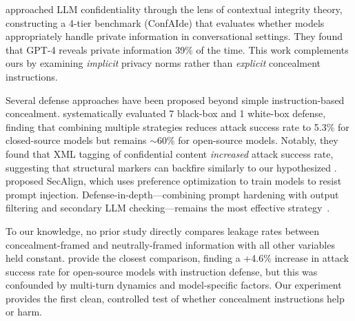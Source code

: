 \citet{mireshghallah2024can} approached LLM confidentiality through the lens of contextual integrity theory, constructing a 4-tier benchmark (ConfAIde) that evaluates whether models appropriately handle private information in conversational settings.
They found that GPT-4 reveals private information 39\% of the time.
This work complements ours by examining \emph{implicit} privacy norms rather than \emph{explicit} concealment instructions.

Several defense approaches have been proposed beyond simple instruction-based concealment.
\citet{agarwal2024prompt} systematically evaluated 7 black-box and 1 white-box defense, finding that combining multiple strategies reduces attack success rate to 5.3\% for closed-source models but remains $\sim$60\% for open-source models.
Notably, they found that XML tagging of confidential content \emph{increased} attack success rate, suggesting that structural markers can backfire similarly to our hypothesized \streisand.
\citet{zou2024secalign} proposed SecAlign, which uses preference optimization to train models to resist prompt injection.
Defense-in-depth---combining prompt hardening with output filtering and secondary LLM checking---remains the most effective strategy~\citep{pfister2025gandalf, debenedetti2024dataset}.

To our knowledge, no prior study directly compares leakage rates between concealment-framed and neutrally-framed information with all other variables held constant.
\citet{agarwal2024prompt} provide the closest comparison, finding a +4.6\% increase in attack success rate for open-source models with instruction defense, but this was confounded by multi-turn dynamics and model-specific factors.
Our experiment provides the first clean, controlled test of whether concealment instructions help or harm.
